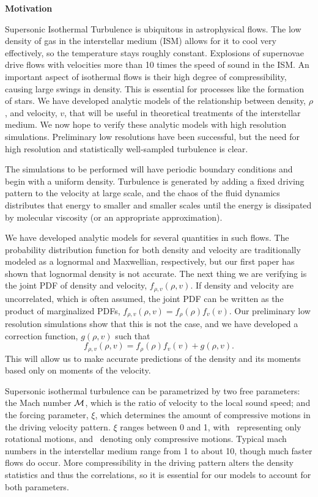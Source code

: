 

\begin{Large}
\noindent\textbf{Motivation}
\end{Large}


Supersonic Isothermal Turbulence is ubiquitous in astrophysical flows.  The low
density of gas in the interstellar medium (ISM) allows for it to cool very
effectively, so the temperature stays roughly constant. Explosions of supernovae
drive flows with velocities more than 10 times the speed of sound in the
ISM.
An important aspect of isothermal flows is their high degree of compressibility,
causing large swings in density.  This 
is essential for processes like the formation of stars.  
We have developed
analytic models of the relationship between  density, $\rho$, and velocity, $v$, that
will be useful in theoretical treatments of the interstellar medium.  We now
hope to verify these analytic models with high resolution simulations.
Preliminary low resolutions have been successful, but the need for high
resolution and statistically well-sampled turbulence is clear.

The simulations to be performed will have periodic boundary conditions and begin
with a uniform density.  Turbulence is generated by adding a fixed driving
pattern to the velocity
 at large scale, and the chaos of the fluid
dynamics distributes that energy to smaller and smaller scales until the energy
is dissipated by molecular viscosity (or an appropriate approximation).

We have developed analytic models for several quantities in such flows.  The
probability distribution function for both density and velocity are
traditionally modeled as a lognormal and Maxwellian, respectively, but our first
paper has shown that lognormal density is not accurate.  The next thing we are
verifying is the joint PDF of density and velocity, $f_{\rho,v}(\rho,v)$.  If
density and velocity are uncorrelated, which is often assumed, the joint PDF can be written as the
product of marginalized PDFs, $f_{\rho,v}(\rho,v)=f_\rho(\rho) f_v(v)$.  Our
preliminary low resolution simulations show that this is not the case, and we have
developed a correction function, $g(\rho,v)$ such that 
$$
f_{\rho,v}(\rho,v)=f_\rho(\rho) f_v(v) + g(\rho,v).
$$
This will allow us to make accurate predictions of the density and its moments
based only on moments of the velocity.

Supersonic isothermal turbulence can be parametrized by two free parameters: the
Mach number $\mathcal{M}$, which is the
ratio of velocity to the local sound speed; and the forcing parameter, $\xi$,
which determines the amount of compressive motions in the driving velocity
pattern.
$\xi$ ranges between 0 and 1, with \xis\ representing only rotational motions,
and \xic\ denoting only compressive motions.  Typical mach numbers in the
interstellar medium range from 1
to about 10, though much faster flows do occur.  More compressibility in the driving pattern alters the density statistics and
thus the correlations, so it is essential for our models to account for both
parameters. 

